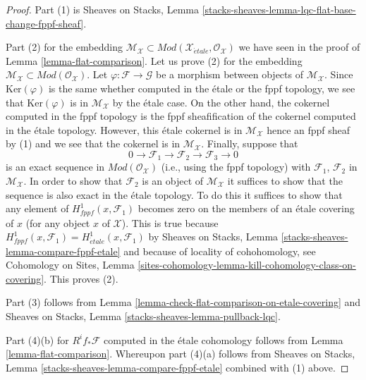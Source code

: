 \begin{proof}
Part (1) is
Sheaves on Stacks, Lemma
\ref{stacks-sheaves-lemma-lqc-flat-base-change-fppf-sheaf}.

\medskip\noindent
Part (2) for the embedding $\mathcal{M}_\mathcal{X} \subset
\textit{Mod}(\mathcal{X}_{\acute{e}tale}, \mathcal{O}_\mathcal{X})$
we have seen in the proof of
Lemma \ref{lemma-flat-comparison}.
Let us prove (2) for the embedding
$\mathcal{M}_\mathcal{X} \subset \textit{Mod}(\mathcal{O}_\mathcal{X})$.
Let $\varphi : \mathcal{F} \to \mathcal{G}$ be a morphism between
objects of $\mathcal{M}_\mathcal{X}$. Since $\text{Ker}(\varphi)$
is the same whether computed in the \'etale or the fppf
topology, we see that $\text{Ker}(\varphi)$ is in
$\mathcal{M}_\mathcal{X}$ by the \'etale case. On the other hand,
the cokernel computed in the fppf topology is the fppf sheafification
of the cokernel computed in the \'etale topology. However, this
\'etale cokernel is in $\mathcal{M}_\mathcal{X}$ hence an fppf sheaf
by (1) and we see that the cokernel is in $\mathcal{M}_\mathcal{X}$.
Finally, suppose that
$$
0 \to \mathcal{F}_1 \to \mathcal{F}_2 \to \mathcal{F}_3 \to 0
$$
is an exact sequence in $\textit{Mod}(\mathcal{O}_\mathcal{X})$
(i.e., using the fppf topology) with $\mathcal{F}_1$, $\mathcal{F}_2$
in $\mathcal{M}_\mathcal{X}$. In order to show that $\mathcal{F}_2$
is an object of $\mathcal{M}_\mathcal{X}$ it suffices to show that
the sequence is also exact in the \'etale topology. To do this it
suffices to show that any element of $H^1_{fppf}(x, \mathcal{F}_1)$
becomes zero on the members of an \'etale covering of $x$ (for any
object $x$ of $\mathcal{X}$). This is true because
$H^1_{fppf}(x, \mathcal{F}_1) = H^1_{\acute{e}tale}(x, \mathcal{F}_1)$ by
Sheaves on Stacks, Lemma \ref{stacks-sheaves-lemma-compare-fppf-etale}
and because of locality of cohohomology, see
Cohomology on Sites, Lemma
\ref{sites-cohomology-lemma-kill-cohomology-class-on-covering}.
This proves (2).

\medskip\noindent
Part (3) follows from
Lemma \ref{lemma-check-flat-comparison-on-etale-covering}
and
Sheaves on Stacks, Lemma \ref{stacks-sheaves-lemma-pullback-lqc}.

\medskip\noindent
Part (4)(b) for $R^if_*\mathcal{F}$ computed in the \'etale cohomology
follows from Lemma \ref{lemma-flat-comparison}.
Whereupon part (4)(a) follows from
Sheaves on Stacks, Lemma \ref{stacks-sheaves-lemma-compare-fppf-etale}
combined with (1) above.
\end{proof}






